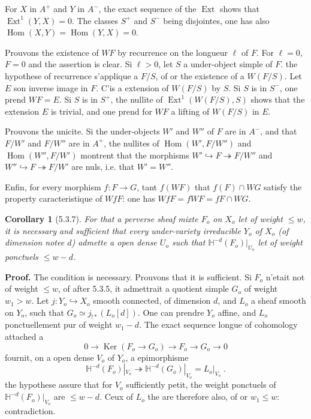 \documentclass[12pt,a4paper]{article}
\theoremstyle{plain}
\newtheorem{corollary}[theorem]{Corollary}
\theoremstyle{definition}
\theoremstyle{remark}
\DeclareMathOperator{\Hom}{Hom}
\DeclareMathOperator{\Ext}{Ext}
\DeclareMathOperator{\Ker}{Ker}
\newcommand{\HH}{\mathbb{H}}
\begin{document}
For $X$ in $A^+$ and $Y$ in $A^-$, the exact sequence of the $\Ext$ shows that $\Ext^1(Y,X) = 0$. The classes $S^+$ and $S^-$ being disjointes, one has also $\Hom(X,Y) = \Hom(Y,X) = 0$.

Prouvons the existence of $WF$ by recurrence on the longueur $\ell$ of $F$. For $\ell = 0$, $F = 0$ and the assertion is clear. Si $\ell > 0$, let $S$ a under-object simple of $F$. the hypothese of recurrence s'applique a $F/S$, of or the existence of a $W(F/S)$. Let $E$ son inverse image in $F$. C'is a extension of $W(F/S)$ by $S$. Si $S$ is in $S^-$, one prend $WF = E$. Si $S$ is in $S^+$, the nullite of $\Ext^1(W(F/S), S)$ shows that the extension $E$ is trivial, and one prend for $WF$ a lifting of $W(F/S)$ in $E$.

Prouvons the unicite. Si the under-objects $W'$ and $W''$ of $F$ are in $A^-$, and that $F/W'$ and $F/W''$ are in $A^+$, the nullites of $\Hom(W', F/W'')$ and $\Hom(W'', F/W')$ montrent that the morphisms $W' \hookrightarrow F \twoheadrightarrow F/W''$ and $W'' \hookrightarrow F \twoheadrightarrow F/W'$ are nuls, i.e. that $W' = W''$.

Enfin, for every morphism $f: F \to G$, tant $f(WF)$ that $f(F) \cap WG$ satisfy the property caracteristique of $WfF$: one has $WfF = fWF = fF \cap WG$.

\begin{corollary}[5.3.7]
For that a perverse sheaf mixte $F_o$ on $X_o$ let of weight $\leq w$, it is necessary and sufficient that every under-variety irreducible $Y_o$ of $X_o$ (of dimension notee $d$) admette a open dense $U_o$ such that $\HH^{-d}(F_o)|_{U_o}$ let of weight ponctuels $\leq w-d$.
\end{corollary}

\noindent\textbf{Proof.} The condition is necessary. Prouvons that it is sufficient. Si $F_o$ n'etait not of weight $\leq w$, of after 5.3.5, it admettrait a quotient simple $G_o$ of weight $w_1 > w$. Let $j: Y_o \hookrightarrow X_o$ smooth connected, of dimension $d$, and $L_o$ a sheaf smooth on $Y_o$, such that $G_o \simeq j_{!*}(L_o[d])$. One can prendre $Y_o$ affine, and $L_o$ ponctuellement pur of weight $w_1-d$. The exact sequence longue of cohomology attached a
\[
0 \to \Ker(F_o \to G_o) \to F_o \to G_o \to 0
\]
fournit, on a open dense $V_o$ of $Y_o$, a epimorphisme
\[
\HH^{-d}(F_o)|_{V_o} \twoheadrightarrow \HH^{-d}(G_o)|_{V_o} = L_o|_{V_o}\;.
\]
the hypothese assure that for $V_o$ sufficiently petit, the weight ponctuels of $\HH^{-d}(F_o)|_{V_o}$ are $\leq w-d$. Ceux of $L_o$ the are therefore also, of or $w_1 \leq w$: contradiction.
\end{document}
